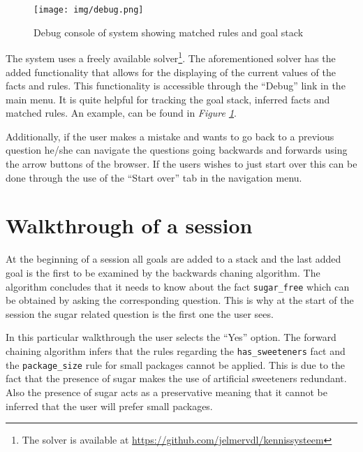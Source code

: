 \documentclass[11pt,a4paper]{article}
\begin{document}
\begin{figure}[!h]
	\centering
	\texttt{[image: img/debug.png]}
	\caption{Debug console of system showing matched rules and goal stack}
	\label{fig:debug}
\end{figure}

The system uses a freely available solver\footnote{The solver is available at \url{https://github.com/jelmervdl/kennissysteem}}. The aforementioned solver has the added functionality that allows for the displaying of the current values of the facts and rules. This functionality is accessible through the ``Debug'' link in the main menu. It is quite helpful for tracking the goal stack, inferred facts and matched rules. An example, can be found in \textit{Figure \ref{fig:debug}}. 

Additionally, if the user makes a mistake and wants to go back to a previous question he/she can navigate the questions going backwards and forwards using the arrow buttons of the browser. If the users wishes to just start over this can be done through the use of the ``Start over'' tab in the navigation menu.

\section{Walkthrough of a session}

At the beginning of a session all goals are added to a stack and the last added goal is the first to be examined by the backwards chaning algorithm. The algorithm concludes that it needs to know about the fact \verb|sugar_free| which can be obtained by asking the corresponding question. This is why at the start of the session the sugar related question is the first one the user sees.

In this particular walkthrough the user selects the ``Yes'' option. The forward chaining algorithm infers that the rules regarding the \verb|has_sweeteners| fact and the \verb|package_size| rule for small packages cannot be applied. This is due to the fact that the presence of sugar makes the use of artificial sweeteners redundant. Also the presence of sugar acts as a preservative meaning that it cannot be inferred that the user will prefer small packages.
\end{document}
